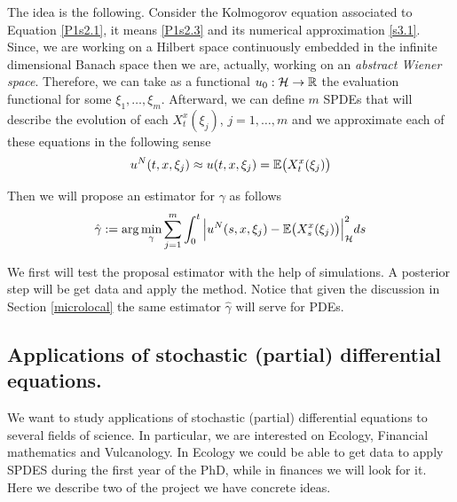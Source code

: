 \documentclass{article}
\numberwithin{equation}{section}
\begin{document}
The idea is the following. Consider the Kolmogorov equation associated to  Equation \eqref{P1s2.1}, it means \eqref{P1s2.3} and its numerical approximation \eqref{s3.1}. Since, we are working on a Hilbert space continuously embedded in the infinite dimensional Banach space then we are, actually, working on an {\it abstract Wiener space}. Therefore, we can take as a functional  $u_0:\mathcal{H}\rightarrow {\mathbb R}$ the evaluation functional for some $\xi_1,\ldots,\xi_m$. Afterward, we can define $m$ SPDEs that will describe the evolution of each $X_t^x(\xi_j)$, $j=1,\ldots,m$ and we approximate each of these equations in the following sense
\begin{align}
 u^N(t,x,\xi_j)\approx u(t,x,\xi_j)=\mathbb{E}\big(X_t^x(\xi_j) \big)
\end{align}

Then we will propose an estimator for $\gamma$ as follows
\begin{align}
 \hat\gamma := \arg\min_{\gamma} \sum_{j=1}^m\int_0^t \Big| u^N(s,x,\xi_j)-\mathbb{E}\big(X_s^x(\xi_j) \big) \Big|_{\mathcal{H}}^2  ds
\end{align}


We first will test the proposal estimator with the help of simulations. A posterior step will be get data and apply the method. Notice that given the discussion in Section \ref{microlocal} the same estimator $ \hat\gamma $ will serve for PDEs.




\subsection{Applications of stochastic (partial) differential equations.}

We want to study applications of stochastic (partial) differential equations to several fields of science. In particular, we are interested on Ecology, Financial mathematics and Vulcanology. In Ecology we could be able to get data to apply SPDES during the first year of the PhD, while in finances we will look for it. Here we describe two of the project we have concrete ideas. 
\end{document}
